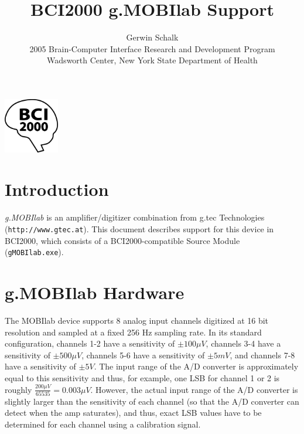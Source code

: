 \documentclass[letterpaper, oneside, 12pt]{article}
\begin{document}
%
\title{BCI2000 g.MOBIlab Support}
\author{Gerwin Schalk\\ \small{2005 Brain-Computer Interface Research and Development Program}\\ \small{Wadsworth Center, New York State Department of Health}}
\maketitle
\centerline{\includegraphics[height=2.4cm,keepaspectratio=true]{BCI2000logo}}




\section{Introduction}

\sloppypar \emph{g.MOBIlab} is an amplifier/digitizer combination from g.tec 
Technologies (\texttt{http://www.gtec.at}). This document describes support for 
this device in BCI2000, which consists of a BCI2000-compatible 
Source Module (\texttt{gMOBIlab.exe}). 

\section{g.MOBIlab Hardware}

The MOBIlab device supports 8 analog input channels digitized at 16 bit 
resolution and sampled at a fixed 256 Hz sampling rate. In its standard 
configuration, channels 1-2 have a sensitivity of $\pm100\mu V$, channels 3-4 
have a sensitivity of $\pm500\mu V$, channels 5-6 have a sensitivity of 
$\pm5mV$, and channels 7-8 have a sensitivity of $\pm5V$. The input range of the 
A/D converter is approximately equal to this sensitivity and thus, for example, 
one LSB for channel 1 or 2 is roughly $\frac{200\mu V}{65535}=0.003\mu V$. However,
the actual input range of the A/D converter is slightly larger than the sensitivity
of each channel (so that the A/D converter can detect when the amp saturates), and
thus, exact LSB values have to be determined for each channel using a calibration signal.
\end{document}
